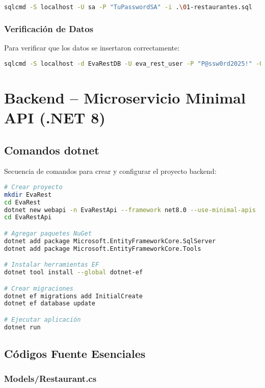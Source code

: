 \documentclass[12pt,a4paper]{report}
\begin{document}
\begin{lstlisting}[language=bash]
sqlcmd -S localhost -U sa -P "TuPasswordSA" -i .\01-restaurantes.sql
\end{lstlisting}

\subsection{Verificación de Datos}
Para verificar que los datos se insertaron correctamente:

\begin{lstlisting}[language=bash]
sqlcmd -S localhost -d EvaRestDB -U eva_rest_user -P "P@ssw0rd2025!" -Q "SELECT * FROM Restaurantes"
\end{lstlisting}


\chapter{Backend – Microservicio Minimal API (.NET 8)}

\section{Comandos dotnet}

Secuencia de comandos para crear y configurar el proyecto backend:

\begin{lstlisting}[language=bash]
# Crear proyecto
mkdir EvaRest
cd EvaRest
dotnet new webapi -n EvaRestApi --framework net8.0 --use-minimal-apis
cd EvaRestApi

# Agregar paquetes NuGet
dotnet add package Microsoft.EntityFrameworkCore.SqlServer
dotnet add package Microsoft.EntityFrameworkCore.Tools

# Instalar herramientas EF
dotnet tool install --global dotnet-ef

# Crear migraciones
dotnet ef migrations add InitialCreate
dotnet ef database update

# Ejecutar aplicación
dotnet run
\end{lstlisting}

\section{Códigos Fuente Esenciales}

\subsection{Models/Restaurant.cs}
\end{document}
